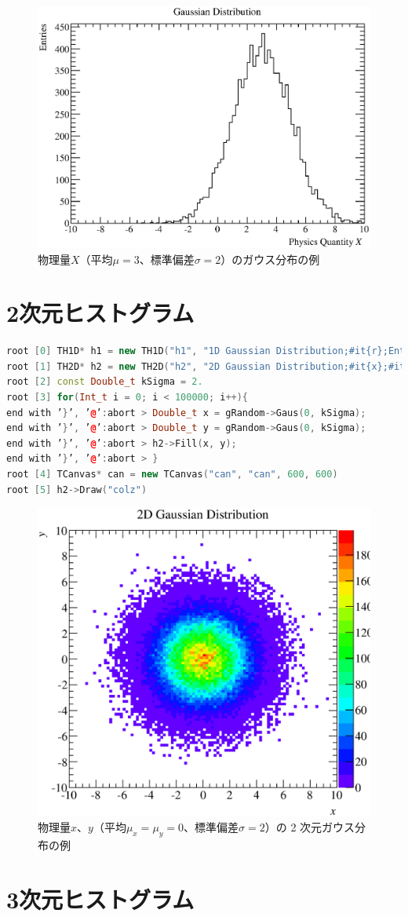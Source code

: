 \begin{figure}
  \centering
  \includegraphics[width=12cm,clip]{fig/TH1D.eps}
  \caption{物理量$X$（平均$\mu = 3$、標準偏差$\sigma = 2$）のガウス分布の例}
  \label{fig_TH1D_eps}
\end{figure}

\section{2次元ヒストグラム}

\begin{lstlisting}[language=c++]
root [0] TH1D* h1 = new TH1D("h1", "1D Gaussian Distribution;#it{r};Entries", 50, 0, 10)
root [1] TH2D* h2 = new TH2D("h2", "2D Gaussian Distribution;#it{x};#it{y};Entries", 100, -10, 10, 100, -10, 10)
root [2] const Double_t kSigma = 2.
root [3] for(Int_t i = 0; i < 100000; i++){
end with ’}’, ’@’:abort > Double_t x = gRandom->Gaus(0, kSigma);
end with ’}’, ’@’:abort > Double_t y = gRandom->Gaus(0, kSigma);
end with ’}’, ’@’:abort > h2->Fill(x, y);
end with ’}’, ’@’:abort > }
root [4] TCanvas* can = new TCanvas("can", "can", 600, 600)
root [5] h2->Draw("colz")
\end{lstlisting}

\begin{figure}
  \centering
  \includegraphics[width=12cm,clip]{fig/TH2D.eps}
  \caption{物理量$x$、$y$（平均$\mu_x = \mu_y = 0$、標準偏差$\sigma = 2$）の 2 次元ガウス分布の例}
  \label{fig_TH2D_eps}
\end{figure}

\section{3次元ヒストグラム}
